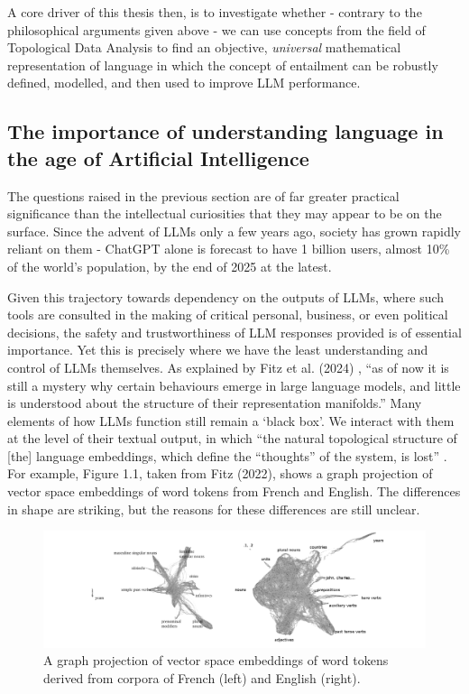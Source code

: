 \documentclass[12pt,twoside]{report}
\begin{document}
A core driver of this thesis then, is to investigate whether - contrary to the philosophical arguments given above - we can use concepts from the field of Topological Data Analysis to find an objective, \textit{universal} mathematical representation of language in which the concept of entailment can be robustly defined, modelled, and then used to improve LLM performance.


\subsection{The importance of understanding language in the age of Artificial Intelligence}
The questions raised in the previous section are of far greater practical significance than the intellectual curiosities that they may appear to be on the surface. Since the advent of LLMs only a few years ago, society has grown rapidly reliant on them - ChatGPT alone is forecast to have 1 billion users, almost 10\% of the world's population, by the end of 2025 at the latest. \cite{forbesChatGPT} \newline \par

Given this trajectory towards dependency on the outputs of LLMs, where such tools are consulted in the making of critical personal, business, or even political decisions, the safety and trustworthiness of LLM responses provided is of essential importance. Yet this is precisely where we have the least understanding and control of LLMs themselves. As explained by Fitz et al. (2024) \cite{fitz2024hiddenholestopologicalaspects}, ``as of now it is still a mystery why certain behaviours emerge in large language models, and little is understood about the structure of their representation manifolds.'' Many elements of how LLMs function still remain a `black box'. We interact with them at the level of their textual output, in which ``the natural topological structure of [the] language embeddings, which define the ``thoughts'' of the system, is lost'' \cite{fitz2024hiddenholestopologicalaspects}. For example, Figure 1.1, taken from Fitz (2022), \cite{fitz22a} shows a graph projection of vector space embeddings of word tokens from French and English. The differences in shape are striking, but the reasons for these differences are still unclear. \newline

\begin{figure}[tb]
\centering
\includegraphics[width = 1\hsize]{./figures/graph_projection_fitz}
\caption{A graph projection of vector space embeddings of word tokens derived from corpora of French (left) and English (right).}
\label{fig:logo}
\end{figure}
\end{document}
